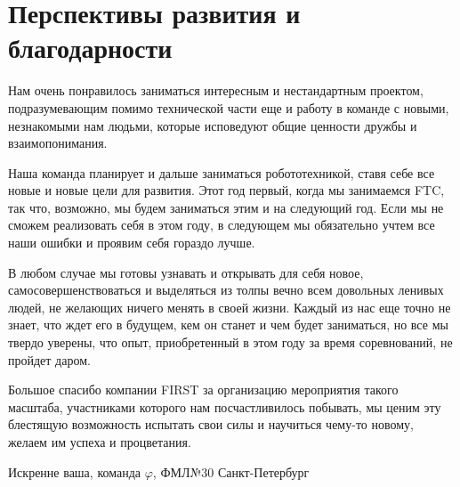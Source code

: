
\section{Перспективы развития и благодарности}
    Нам очень понравилось заниматься интересным и нестандартным проектом, подразумевающим помимо технической части еще и работу в команде с новыми, незнакомыми нам людьми, которые исповедуют общие ценности дружбы и взаимопонимания.\newline
    
    Наша команда планирует и дальше заниматься робототехникой, ставя себе все новые и новые цели для развития. Этот год первый, когда мы занимаемся FTC, так что, возможно, мы будем заниматься этим и на следующий год. Если мы не сможем реализовать себя в этом году, в следующем мы обязательно учтем все наши ошибки и проявим себя гораздо лучше.\newline
    
    В любом случае мы готовы узнавать и открывать для себя новое, самосовершенствоваться и выделяться из толпы вечно всем довольных ленивых людей, не желающих ничего менять в своей жизни. Каждый из нас еще точно не знает, что ждет его в будущем, кем он станет и чем будет заниматься, но все мы твердо уверены, что опыт, приобретенный в этом году за время соревнований, не пройдет даром.\newline
    
    Большое спасибо компании FIRST за организацию мероприятия такого масштаба, участниками которого нам посчастливилось побывать, мы ценим эту блестящую возможность испытать свои силы и научиться чему-то новому, желаем им успеха и процветания.\newline
    
    \begin{center}
      Искренне ваша, команда $\varphi$, ФМЛ№30 Санкт-Петербург
    \end{center}
\newpage
